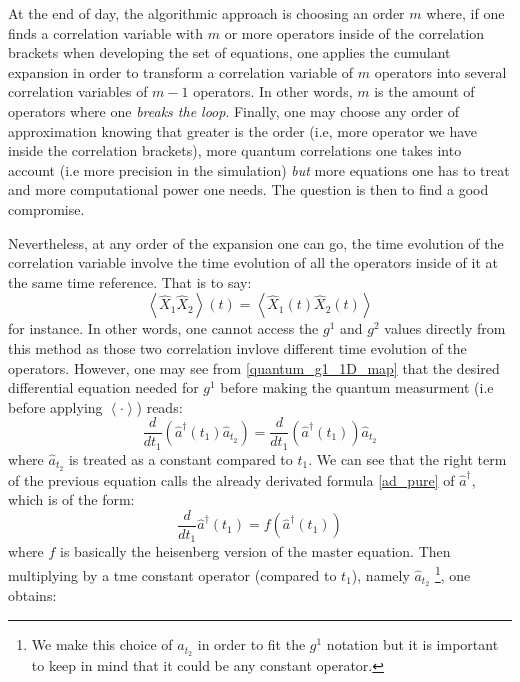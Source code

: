 \documentclass[12pt]{report}
\begin{document}
At the end of day, the algorithmic approach is choosing an order $m$ where, if one finds a correlation variable with $m$ or more operators inside of the correlation brackets when developing the set of equations, one applies the cumulant expansion in order to transform a correlation variable of $m$ operators into several correlation variables of $m-1$ operators. In other words, $m$ is the amount of operators where one \textit{breaks the loop}. Finally, one may choose any order of approximation knowing that greater is the order (i.e, more operator we have inside the correlation brackets), more quantum correlations one takes into account (i.e more precision in the simulation) \textit{but} more equations one has to treat and more computational power one needs. The question is then to find a good compromise.

Nevertheless, at any order of the expansion one can go, the time evolution of the correlation variable involve the time evolution of all the operators inside of it at the same time reference. That is to say:
\begin{equation}
\left\langle\hat{X}_1\hat{X}_2\right\rangle (t) = \left\langle\hat{X}_1(t)\hat{X}_2(t)\right\rangle
\end{equation}
for instance. In other words, one cannot access the $g^1$ and $g^2$ values directly from this method as those two correlation invlove different time evolution of the operators. However, one may see from \eqref{quantum_g1_1D_map} that the desired differential equation needed for $g^1$ before making the quantum measurment (i.e before applying $\left\langle \cdot \right\rangle$) reads:
\begin{equation}
\frac{d}{dt_1} \left(\hat{a}^\dagger(t_1)\hat{a}_{t_2}\right) = \frac{d}{dt_1} \left(\hat{a}^\dagger(t_1)\right)\hat{a}_{t_2}
\end{equation}
where $\hat{a}_{t_2}$ is treated as a constant compared to $t_1$. We can see that the right term of the previous equation calls the already derivated formula \eqref{ad_pure} of $\hat{a}^\dagger$, which is of the form:
\begin{equation}
\frac{d}{dt_1} \hat{a}^\dagger(t_1) = f(\hat{a}^\dagger(t_1)) 
\end{equation}
where $f$ is basically the heisenberg version of the master equation. Then multiplying by a tme constant operator (compared to $t_1$), namely $\hat{a}_{t_2}$ \footnote{We make this choice of $\hat{a}_{t_2}$ in order to fit the $g^1$ notation but it is important to keep in mind that it could be any constant operator.}, one obtains:
\end{document}

